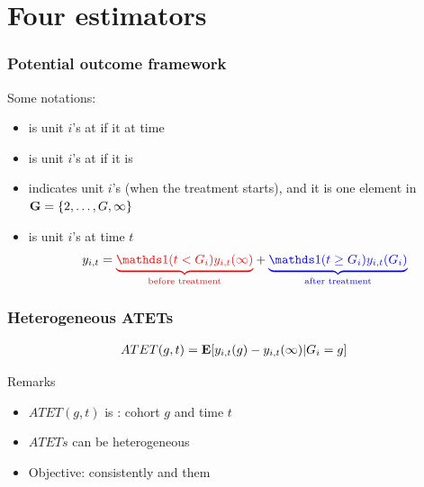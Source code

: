 \documentclass[11pt]{beamer}
\begin{document}
\section{Four estimators}
\begin{frame}
  \frametitle{Potential outcome framework}
Some notations:

\begin{itemize}
\item {} is unit $i$'s  at
   if it  at time 

\item {} is unit $i$'s  at
   if it is 

\item {} indicates unit $i$'s  (when the treatment
  starts), and it is one element
  in $\mathbf{G} = \{2, \ldots, G, \infty\}$

\item {} is unit $i$'s  at time $t$
  $$
  y_{i,t} = \myred{\underbrace{\I(t < G_i) y_{i, t}(\infty)}_\text{before
  treatment}} 
  + \myblue{\underbrace{\I(t \geq G_i) y_{i,t}(G_i)}_\text{after treatment}}
  $$
\end{itemize}
\end{frame}

\begin{frame}
  \frametitle{Heterogeneous ATETs}
\begin{align*}
  ATET(g, t) = \mathbf{E}[y_{i, t}(g) - y_{i, t}(\infty) | G_i = g]
\end{align*}

Remarks
\begin{itemize}
\item $ATET(g, t)$ is : cohort $g$ and time
  $t$

\item $ATETs$ can be heterogeneous  

\item Objective: consistently  and  them
\end{itemize}
\end{frame}
\end{document}
